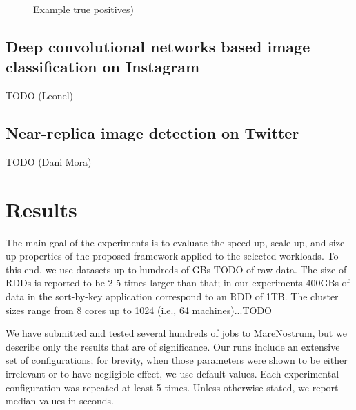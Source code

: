 \documentclass[journal]{IEEEtran}
\begin{document}
\begin{figure}
\caption{Example true positives)}
\label{fig:spamexamples}
\end{figure}

\subsection{Deep convolutional networks based image classification on Instagram}

TODO (Leonel)

\subsection{Near-replica image detection on Twitter}

TODO (Dani Mora)

%
\section{Results}
%
The main goal of the experiments is to evaluate the speed-up, scale-up, and size-up properties of the proposed framework applied to the selected workloads. To this end, we use datasets up to hundreds of GBs TODO of raw data. The size of RDDs is reported to be 2-5 times larger than that; in our experiments 400GBs of data in the sort-by-key application correspond to an RDD of 1TB.
 The cluster sizes range from 8 cores up to 1024 (i.e., 64 machines)...TODO

We have submitted and tested several hundreds of jobs to MareNostrum, but we describe only the results that are of significance. Our runs include an extensive  set of configurations; for brevity, when those parameters were shown to be either irrelevant or to have negligible effect, we use default values. Each experimental configuration was repeated at least 5 times. Unless otherwise stated, we report median values in seconds. 
\end{document}
